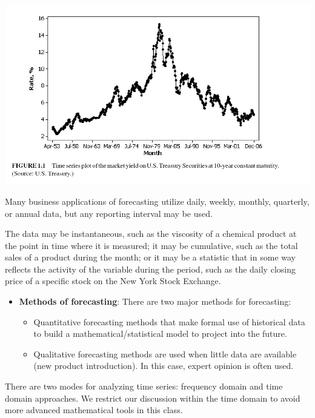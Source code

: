 \documentclass[
]{book}
\begin{document}
\begin{center}\includegraphics[width=0.8\linewidth]{img11/w11-Figure01} \end{center}

Many business applications of forecasting utilize daily, weekly, monthly, quarterly, or annual data, but any reporting interval may be used.

The data may be instantaneous, such as the viscosity of a chemical product at the point in time where it is measured; it may be cumulative, such as the total sales of a product during the month; or it may be a statistic that in some way reflects the activity of the variable during the period, such as the daily closing price of a specific stock on the New York Stock Exchange.

\begin{itemize}
\item
  \textbf{Methods of forecasting}: There are two major methods for forecasting:

  \begin{itemize}
  \item
    Quantitative forecasting methods that make formal use of historical data to build a mathematical/statistical model to project into the future.
  \item
    Qualitative forecasting methods are used when little data are available (new product introduction). In this case, expert opinion is often used.
  \end{itemize}
\end{itemize}

There are two modes for analyzing time series: frequency domain and time domain approaches. We restrict our discussion within the time domain to avoid more advanced mathematical tools in this class.
\end{document}
